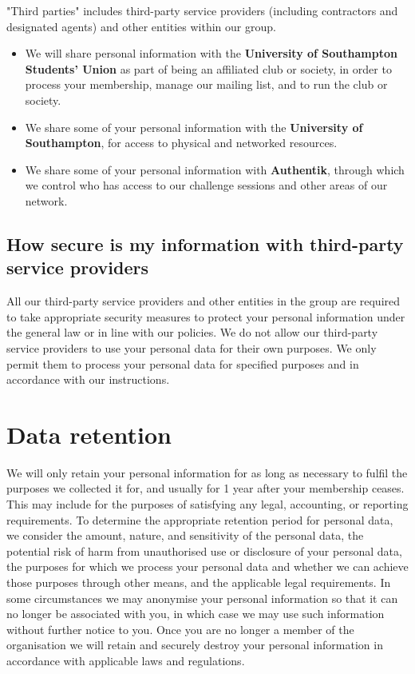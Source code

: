 \documentclass[12pt]{article}
\begin{document}
"Third parties" includes third-party service providers (including contractors and designated agents) and other entities within our group. 
\begin{itemize}
\item We will share personal information with the \textbf{University of Southampton Students’ Union} as part of being an affiliated club or society, in order to process your membership, manage our mailing list, and to run the club or society.
\item We share some of your personal information with the \textbf{University of Southampton}, for access to physical and networked resources.
\item We share some of your personal information with \textbf{Authentik}, through which we control who has access to our challenge sessions and other areas of our network.
\end{itemize}

\subsection{How secure is my information with third-party service providers}

All our third-party service providers and other entities in the group are required to take appropriate security measures to protect your personal information under the general law or in line with our policies. We do not allow our third-party service providers to use your personal data for their own purposes. We only permit them to process your personal data for specified purposes and in accordance with our instructions.

\section{Data retention}
We will only retain your personal information for as long as necessary to fulfil the purposes we collected it for, and usually for 1 year after your membership ceases. This may include for the purposes of satisfying any legal, accounting, or reporting requirements. To determine the appropriate retention period for personal data, we consider the amount, nature, and sensitivity of the personal data, the potential risk of harm from unauthorised use or disclosure of your personal data, the purposes for which we process your personal data and whether we can achieve those purposes through other means, and the applicable legal requirements. 
In some circumstances we may anonymise your personal information so that it can no longer be associated with you, in which case we may use such information without further notice to you. Once you are no longer a member of the organisation we will retain and securely destroy your personal information in accordance with applicable laws and regulations.
\end{document}
